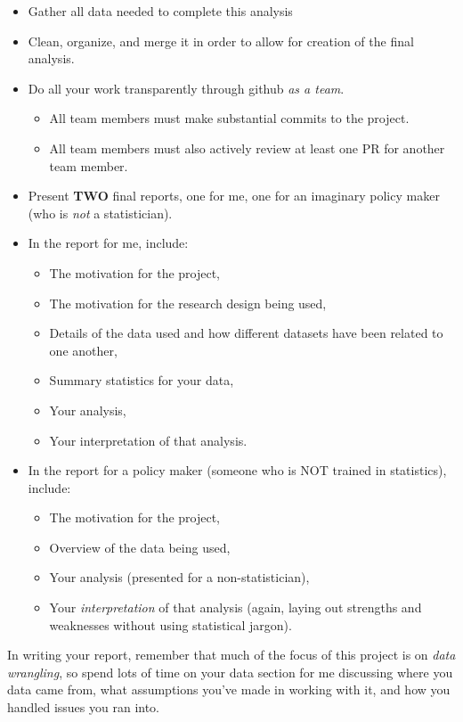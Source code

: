 \documentclass[12pt]{article}
\begin{document}
\begin{itemize}
  \item Gather all data needed to complete this analysis
  \item Clean, organize, and merge it in order to allow for creation of the final analysis.
  \item Do all your work transparently through github \emph{as a team}.
  \begin{itemize}
    \item All team members must make substantial commits to the project.
    \item All team members must also actively review at least one PR for another team member.
  \end{itemize}
  \item Present \textbf{TWO} final reports, one for me, one for an imaginary policy maker (who is \emph{not} a statistician).
  \item In the report for me, include:
  \begin{itemize}
    \item The motivation for the project,
    \item The motivation for the research design being used,
    \item Details of the data used and how different datasets have been related to one another,
    \item Summary statistics for your data,
    \item Your analysis,
    \item Your interpretation of that analysis.
  \end{itemize}
  \item In the report for a policy maker (someone who is NOT trained in statistics), include:
  \begin{itemize}
    \item The motivation for the project,
    \item Overview of the data being used,
    \item Your analysis (presented for a non-statistician),
    \item Your \emph{interpretation} of that analysis (again, laying out strengths and weaknesses without using statistical jargon).
  \end{itemize}
\end{itemize}


In writing your report, remember that much of the focus of this project is on \emph{data wrangling}, so spend lots of time on your data section for me discussing where you data came from, what assumptions you've made in working with it, and how you handled issues you ran into.
\end{document}
